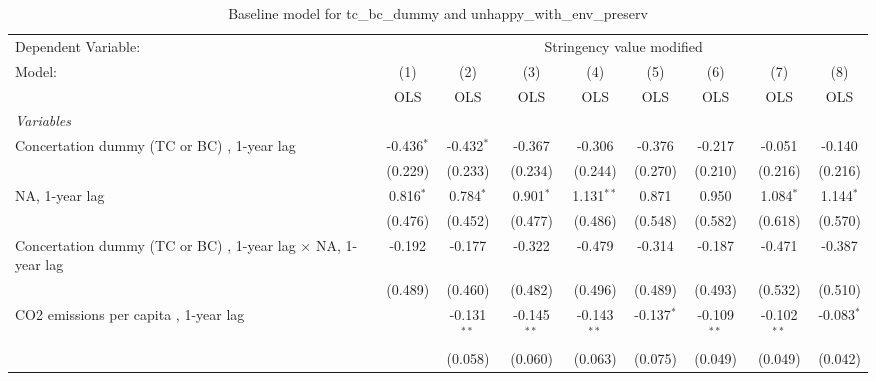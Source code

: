 
\begin{table}[htbp]
   \caption{Baseline model for tc\_bc\_dummy and unhappy\_with\_env\_preserv}
   \centering
   \begin{tabular}{lcccccccc}
      \toprule
      Dependent Variable: & \multicolumn{8}{c}{Stringency value modified}\\
      Model:                                                              & (1)          & (2)           & (3)           & (4)           & (5)          & (6)           & (7)           & (8)\\  
                                                                          &  OLS         & OLS           & OLS           & OLS           & OLS          & OLS           & OLS           & OLS\\  
      \midrule
      \emph{Variables}\\
      Concertation dummy (TC or BC) , 1-year lag                          & -0.436$^{*}$ & -0.432$^{*}$  & -0.367        & -0.306        & -0.376       & -0.217        & -0.051        & -0.140\\   
                                                                          & (0.229)      & (0.233)       & (0.234)       & (0.244)       & (0.270)      & (0.210)       & (0.216)       & (0.216)\\   
      NA, 1-year lag                                                      & 0.816$^{*}$  & 0.784$^{*}$   & 0.901$^{*}$   & 1.131$^{**}$  & 0.871        & 0.950         & 1.084$^{*}$   & 1.144$^{*}$\\   
                                                                          & (0.476)      & (0.452)       & (0.477)       & (0.486)       & (0.548)      & (0.582)       & (0.618)       & (0.570)\\   
      Concertation dummy (TC or BC) , 1-year lag $\times$ NA, 1-year lag  & -0.192       & -0.177        & -0.322        & -0.479        & -0.314       & -0.187        & -0.471        & -0.387\\   
                                                                          & (0.489)      & (0.460)       & (0.482)       & (0.496)       & (0.489)      & (0.493)       & (0.532)       & (0.510)\\   
      CO2 emissions per capita , 1-year lag                               &              & -0.131$^{**}$ & -0.145$^{**}$ & -0.143$^{**}$ & -0.137$^{*}$ & -0.109$^{**}$ & -0.102$^{**}$ & -0.083$^{*}$\\   
                                                                          &              & (0.058)       & (0.060)       & (0.063)       & (0.075)      & (0.049)       & (0.049)       & (0.042)\\   

\end{tabular}
\end{table}
